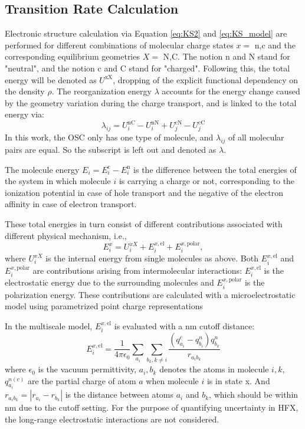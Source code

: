 \documentclass[%
 reprint,
 amsmath,amssymb,
 aps,
]{revtex4-2}
\begin{document}
\subsection{Transition Rate Calculation}
Electronic structure calculation via Equation \ref{eq:KS2} and \ref{eq:KS_model} are performed for different combinations of molecular charge states $x=$ n,c and the corresponding equilibrium geometries $X=$ N,C. The notion n and N stand for "neutral", and the notion c and C stand for "charged". 
Following this, the total energy will be denoted as $U^\text{xX}$, dropping of the explicit functional dependency on the density $\rho$. 
The reorganization energy $\lambda$ accounts for the energy change caused by the geometry variation during the charge transport, and is linked to the total energy via:
%
\begin{equation}
    \lambda_{ij} = U_i^\text{nC} - U_i^\text{nN} + U_j^\text{cN} - U_j^\text{cC}
    \label{eq:lambda}
\end{equation}
%
In this work, the OSC only has one type of molecule, and $\lambda_{ij}$ of all molecular pairs are equal. So the subscript is left out and denoted as $\lambda$.

The molecule energy $E_i = E_i^\text{c} - E_i^\text{n}$ is the difference between the total energies of the system in which molecule $i$ is carrying a charge or not, corresponding to the ionization potential in case of hole transport and the negative of the electron affinity in case of electron transport. 

These total energies in turn consist of different contributions associated with different physical mechanism, i.e.,
%
\begin{equation}
E_i^x = U_i^{xX} + E_i^{x,\text{el}} + E_i^{x,\text{polar}},
\label{eq:Es}
\end{equation}
%
where $U_i^{xX}$ is the internal energy from single molecules as above.
Both $E_i^{x,\text{el}}$ and $E_i^{x,\text{polar}}$ are contributions arising from intermolecular interactions: $E_i^{x,\text{el}}$ is the electrostatic energy due to the surrounding molecules and $E_i^{x,\text{polar}}$ is the polarization energy. 
These contributions are calculated with a microelectrostatic model using parametrized point charge representations\cite{https://doi.org/10.1002/jcc.540110311}

In the multiscale model, $E_i^{x,\text{el}}$ is evaluated with a \unit[4]{nm} cutoff distance:
\begin{equation}
    E_i^{x,\text{el}} = \frac{1}{4 \pi \epsilon_0} \sum\limits_{a_i} \sum\limits_{b_k,k \neq i} \frac{(q^c_{a_i} - q^n_{b_i})q^n_{b_k}}{ r_{a_i b_k}} 
\end{equation}
where $\epsilon_0$ is the vacuum permittivity, $a_i, b_k$ denotes the atoms in molecule $i,k$, $q^{n(c)}_{a_i}$ are the partial charge of atom $a$ when molecule $i$ is in state x. And $r_{a_i b_k} = |r_{a_i} - r_{b_k}|$ is the distance between atoms $a_i$ and $b_k$, which should be within \unit[4]{nm} due to the cutoff setting. 
For the purpose of quantifying uncertainty in HFX, the long-range electrostatic interactions are not considered. 
\end{document}
